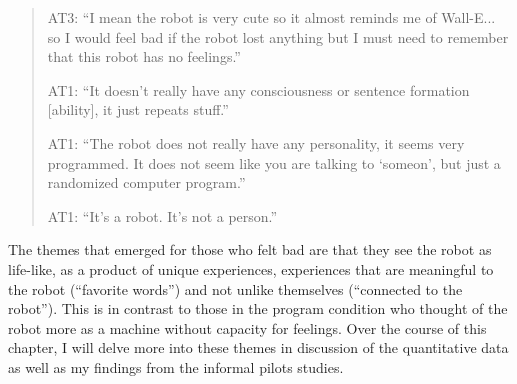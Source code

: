 \begin{quotation}
AT3: ``I mean the robot is very cute so it almost reminds me of Wall-E... so I would feel bad if the robot lost anything but I must need to remember that this robot has no feelings.''

AT1: ``It doesn't really have any consciousness or sentence formation [ability], it just repeats stuff.''

AT1: ``The robot does not really have any personality, it seems very programmed. It does not seem like you are talking to \lq someon\rq, but just a randomized computer program.''

AT1: ``It's a robot. It's not a person.''
\end{quotation}


The themes that emerged for those who felt bad are that they see the robot as life-like, as a product of unique experiences, experiences that are meaningful to the robot (``favorite words'') and not unlike themselves (``connected to the robot''). This is in contrast to those in the program condition who thought of the robot more as a machine without capacity for feelings. Over the course of this chapter, I will delve more into these themes in discussion of the quantitative data as well as my findings from the informal pilots studies.













% 


